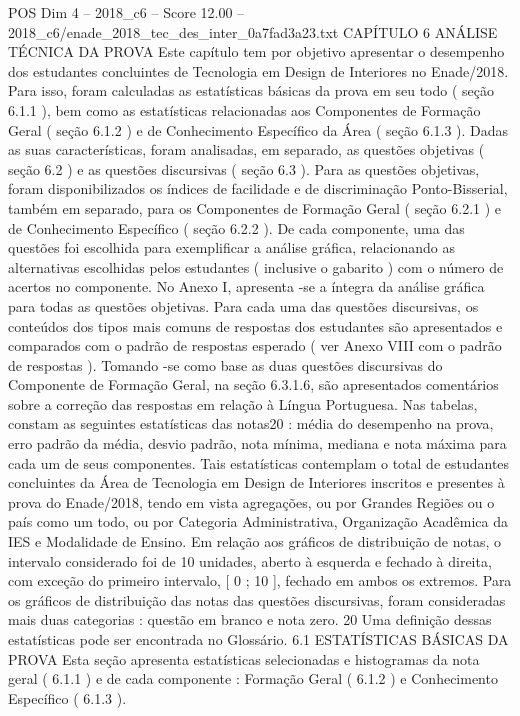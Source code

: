 \begin{textsample}{POS Dim 4 – 2018\_c6 – Score 12.00 – 2018\_c6/enade\_2018\_tec\_des\_inter\_0a7fad3a23.txt}  \label{ex:f4_pos_020}
CAPÍTULO 6 ANÁLISE TÉCNICA DA PROVA Este capítulo tem por objetivo apresentar o desempenho dos estudantes concluintes de Tecnologia em Design de Interiores no Enade/2018.
Para isso, foram calculadas as estatísticas básicas da prova em seu todo ( seção 6.1.1 ), bem como as estatísticas relacionadas aos Componentes de Formação Geral ( seção 6.1.2 ) e de Conhecimento Específico da Área ( seção 6.1.3 ).
Dadas as suas características, foram analisadas, em separado, as questões objetivas ( seção 6.2 ) e as questões discursivas ( seção 6.3 ).
Para as questões objetivas, foram disponibilizados os índices de facilidade e de discriminação Ponto-Bisserial, também em separado, para os Componentes de Formação Geral ( seção 6.2.1 ) e de Conhecimento Específico ( seção 6.2.2 ).
De cada componente, uma das questões foi escolhida para exemplificar a análise gráfica, relacionando as alternativas escolhidas pelos estudantes ( inclusive o gabarito ) com o número de acertos no componente.
No Anexo I, apresenta -se a íntegra da análise gráfica para todas as questões objetivas.
Para cada uma das questões discursivas, os conteúdos dos tipos mais comuns de respostas dos estudantes são apresentados e comparados com o padrão de respostas esperado ( ver Anexo VIII com o padrão de respostas ).
Tomando -se como base as duas questões discursivas do Componente de Formação Geral, na seção 6.3.1.6, são apresentados comentários sobre a correção das respostas em relação à Língua Portuguesa.
Nas tabelas, constam as seguintes estatísticas das notas20 : média do desempenho na prova, erro padrão da média, desvio padrão, nota mínima, mediana e nota máxima para cada um de seus componentes.
Tais estatísticas contemplam o total de estudantes concluintes da Área de Tecnologia em Design de Interiores inscritos e presentes à prova do Enade/2018, tendo em vista agregações, ou por Grandes Regiões ou o país como um todo, ou por Categoria Administrativa, Organização Acadêmica da IES e Modalidade de Ensino.
Em relação aos gráficos de distribuição de notas, o intervalo considerado foi de 10 unidades, aberto à esquerda e fechado à direita, com exceção do primeiro intervalo, [ 0 ; 10 ], fechado em ambos os extremos.
Para os gráficos de distribuição das notas das questões discursivas, foram consideradas mais duas categorias : questão em branco e nota zero. 20 Uma definição dessas estatísticas pode ser encontrada no Glossário. 6.1 ESTATÍSTICAS BÁSICAS DA PROVA Esta seção apresenta estatísticas selecionadas e histogramas da nota geral ( 6.1.1 ) e de cada componente : Formação Geral ( 6.1.2 ) e Conhecimento Específico ( 6.1.3 ).

\end{textsample}
